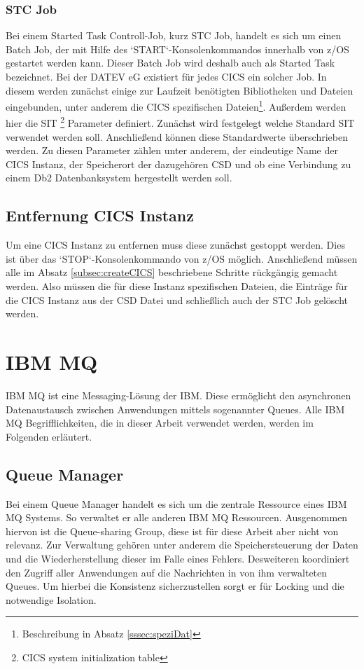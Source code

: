 \subsubsection{STC Job}
Bei einem Started Task Controll-Job, kurz STC Job, handelt es sich um einen Batch Job, der mit Hilfe des `START`-Konsolenkommandos innerhalb von z/OS gestartet werden kann.
Dieser Batch Job wird deshalb auch als Started Task bezeichnet.\cite{Cassier.2007}
Bei der DATEV eG existiert für jedes CICS ein solcher Job.
In diesem werden zunächst einige zur Laufzeit benötigten Bibliotheken und Dateien eingebunden, unter anderem die CICS spezifischen Dateien\footnote{Beschreibung in Absatz \ref{sssec:speziDat}}.
Außerdem werden hier die SIT \footnote{CICS system initialization table} Parameter definiert.
Zunächst wird festgelegt welche Standard SIT verwendet werden soll.
Anschließend können diese Standardwerte überschrieben werden.
Zu diesen Parameter zählen unter anderem, der eindeutige Name der CICS Instanz, der Speicherort der dazugehören CSD und ob eine Verbindung zu einem Db2 Datenbanksystem hergestellt werden soll.

\subsection{Entfernung CICS Instanz}
Um eine CICS Instanz zu entfernen muss diese zunächst gestoppt werden.
Dies ist über das `STOP`-Konsolenkommando von z/OS möglich.
Anschließend müssen alle im Absatz \ref{subsec:createCICS} beschriebene Schritte rückgängig gemacht werden.
Also müssen die für diese Instanz spezifischen Dateien, die Einträge für die CICS Instanz aus der CSD Datei und schließlich auch der STC Job gelöscht werden.

\section{IBM MQ}
IBM MQ ist eine Messaging-Lösung der IBM.
Diese ermöglicht den asynchronen Datenaustausch zwischen Anwendungen mittels sogenannter Queues.
Alle IBM MQ Begrifflichkeiten, die in dieser Arbeit verwendet werden, werden im Folgenden erläutert.
\cite{Aranha.2013}

\subsection{Queue Manager}
Bei einem Queue Manager handelt es sich um die zentrale Ressource eines IBM MQ Systems.
So verwaltet er alle anderen IBM MQ Ressourcen.
Ausgenommen hiervon ist die Queue-sharing Group, diese ist für diese Arbeit aber nicht von relevanz.
Zur Verwaltung gehören unter anderem die Speichersteuerung der Daten und die Wiederherstellung dieser im Falle eines Fehlers.
Desweiteren koordiniert den Zugriff aller Anwendungen auf die Nachrichten in von ihm verwalteten Queues.
Um hierbei die Konsistenz sicherzustellen sorgt er für Locking und die notwendige Isolation.
\cite{Aranha.2013}

